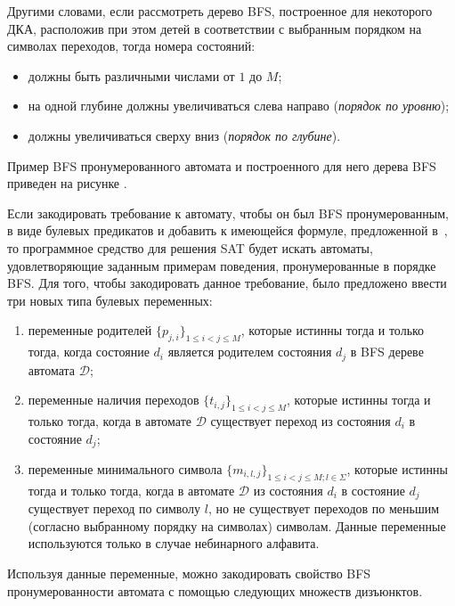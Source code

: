Другими словами, если рассмотреть дерево BFS, построенное для некоторого ДКА, расположив при этом детей в соответствии с выбранным порядком на символах переходов, тогда номера состояний:
\begin{itemize}
  \item должны быть различными числами от $1$ до $M$;
  \item на одной глубине должны увеличиваться слева направо (\emph{порядок по уровню});
  \item должны увеличиваться сверху вниз (\emph{порядок по глубине}).
\end{itemize}
Пример BFS пронумерованного автомата и построенного для него дерева BFS приведен на рисунке .

Если закодировать требование к автомату, чтобы он был BFS пронумерованным, в виде булевых предикатов и добавить к имеющейся формуле, предложенной в~\cite{heule-icgi10}, то программное средство для решения SAT будет искать автоматы, удовлетворяющие заданным примерам поведения, пронумерованные в порядке BFS.
Для того, чтобы закодировать данное требование, было предложено ввести три новых типа булевых переменных:

\begin{enumerate}
  \item переменные родителей $\{p_{j,i}\}_{1 \leq i < j \leq M}$, которые истинны тогда и только тогда, когда состояние $d_i$ является родителем состояния $d_j$ в BFS дереве автомата $\mathcal{D}$;
  \item переменные наличия переходов $\{t_{i,j}\}_{1 \leq i < j \leq M}$, которые истинны тогда и только тогда, когда в автомате $\mathcal{D}$ существует переход из состояния $d_{i}$ в состояние $d_{j}$;
  \item переменные минимального символа $\{m_{i,l,j}\}_{1 \leq i < j \leq M;l \in \Sigma}$, которые истинны тогда и только тогда, когда в автомате $\mathcal{D}$ из состояния $d_{i}$ в состояние $d_{j}$ существует переход по символу $l$, но не существует переходов по меньшим (согласно выбранному порядку на символах) символам.
  Данные переменные используются только в случае небинарного алфавита.
\end{enumerate}

Используя данные переменные, можно закодировать свойство BFS пронумерованности автомата с помощью следующих множеств дизъюнктов.

